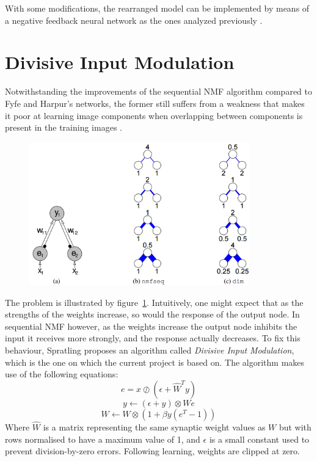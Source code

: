 \documentclass[11pt,a4paper]{report}
\begin{document}
				With some modifications, the rearranged model can be implemented by means of a negative feedback neural network as the ones analyzed previously \cite{spratling2008reconciling}.
				
		\section{Divisive Input Modulation}
			\label{sec:dim}
			Notwithstanding the improvements of the sequential NMF algorithm compared to Fyfe and Harpur's networks, the former still suffers from a weakness that makes it poor at learning image components when overlapping between components is present in the training images \cite{spratling2009unsupervised}.
			
			\begin{figure}[h]
				\centering
				\includegraphics[width=0.85\textwidth]{nmf_problem}
				\caption{\cite{spratling2009unsupervised}}
				\label{fig:nmf_problem}
			\end{figure}	
					
			The problem is illustrated by figure~\ref{fig:nmf_problem}. Intuitively, one might expect that as the strengths of the weights increase, so would the response of the output node. In sequential NMF however, as the weights increase the output node inhibits the input it receives more strongly, and the response actually decreases. To fix this behaviour, Spratling \cite{spratling2009unsupervised} proposes an algorithm called \emph{Divisive Input Modulation}, which is the one on which the current project is based on. The algorithm makes use of the following equations:
			\begin{equation}
				e = x \oslash (\epsilon + \hat{W}^T y)
			\end{equation}
			\begin{equation}
				y \leftarrow (\epsilon + y) \otimes We
			\end{equation}
			\begin{equation}
				W \leftarrow W \otimes (1 + \beta y (e^T - 1))
			\end{equation}
			Where $\hat{W}$ is a matrix representing the same synaptic weight values as $W$ but with rows normalised to have a maximum value of 1, and $\epsilon$ is a small constant used to prevent division-by-zero errors. Following learning, weights are clipped at zero.
			
\end{document}
